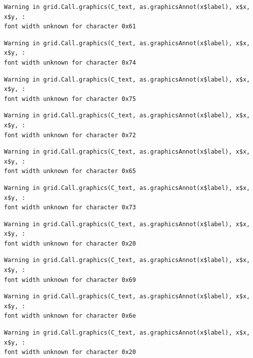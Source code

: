 \documentclass[
  letterpaper,
  DIV=11,
  numbers=noendperiod]{scrreprt}
\begin{document}
\begin{verbatim}
Warning in grid.Call.graphics(C_text, as.graphicsAnnot(x$label), x$x, x$y, :
font width unknown for character 0x61
\end{verbatim}

\begin{verbatim}
Warning in grid.Call.graphics(C_text, as.graphicsAnnot(x$label), x$x, x$y, :
font width unknown for character 0x74
\end{verbatim}

\begin{verbatim}
Warning in grid.Call.graphics(C_text, as.graphicsAnnot(x$label), x$x, x$y, :
font width unknown for character 0x75
\end{verbatim}

\begin{verbatim}
Warning in grid.Call.graphics(C_text, as.graphicsAnnot(x$label), x$x, x$y, :
font width unknown for character 0x72
\end{verbatim}

\begin{verbatim}
Warning in grid.Call.graphics(C_text, as.graphicsAnnot(x$label), x$x, x$y, :
font width unknown for character 0x65
\end{verbatim}

\begin{verbatim}
Warning in grid.Call.graphics(C_text, as.graphicsAnnot(x$label), x$x, x$y, :
font width unknown for character 0x73
\end{verbatim}

\begin{verbatim}
Warning in grid.Call.graphics(C_text, as.graphicsAnnot(x$label), x$x, x$y, :
font width unknown for character 0x20
\end{verbatim}

\begin{verbatim}
Warning in grid.Call.graphics(C_text, as.graphicsAnnot(x$label), x$x, x$y, :
font width unknown for character 0x69
\end{verbatim}

\begin{verbatim}
Warning in grid.Call.graphics(C_text, as.graphicsAnnot(x$label), x$x, x$y, :
font width unknown for character 0x6e
\end{verbatim}

\begin{verbatim}
Warning in grid.Call.graphics(C_text, as.graphicsAnnot(x$label), x$x, x$y, :
font width unknown for character 0x20
\end{verbatim}
\end{document}
